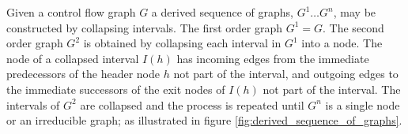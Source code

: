 Given a control flow graph $G$ a derived sequence of graphs, $G^1 \dots G^n$, may be constructed by collapsing intervals. The first order graph $G^1 = G$. The second order graph $G^2$ is obtained by collapsing each interval in $G^1$ into a node. The node of a collapsed interval $I(h)$ has incoming edges from the immediate predecessors of the header node $h$ not part of the interval, and outgoing edges to the immediate successors of the exit nodes of $I(h)$ not part of the interval. The intervals of $G^2$ are collapsed and the process is repeated until $G^n$ is a single node or an irreducible graph; as illustrated in figure \ref{fig:derived_sequence_of_graphs}.

\begin{figure}[htbp]
	\centering
	\begin{subfigure}[b]{0.30\textwidth}
		\centering

\end{subfigure}
\end{figure}
